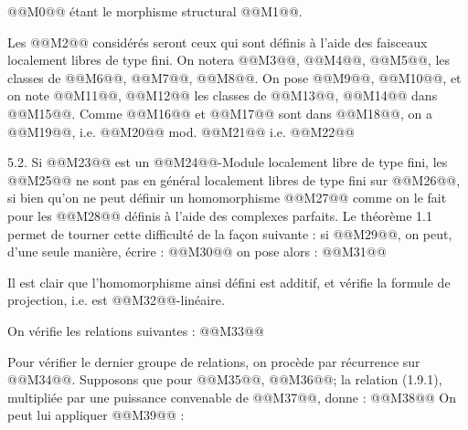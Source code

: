 
@@M0@@
étant le morphisme structural @@M1@@.

Les @@M2@@ considérés seront ceux qui sont définis à l'aide des faisceaux localement libres de type fini. On notera @@M3@@, @@M4@@, @@M5@@, les classes de @@M6@@, @@M7@@, @@M8@@. On pose @@M9@@, @@M10@@, et on note @@M11@@, @@M12@@ les classes de @@M13@@, @@M14@@ dans @@M15@@. Comme @@M16@@ et @@M17@@ sont dans @@M18@@, on a @@M19@@, i.e. @@M20@@ mod. @@M21@@ i.e. @@M22@@

5.2.
Si @@M23@@ est un @@M24@@-Module localement libre de type fini, les @@M25@@ ne sont pas en général localement libres de type fini sur @@M26@@, si bien qu'on ne peut définir un homomorphisme @@M27@@ comme on le fait pour les @@M28@@ définis à l'aide des complexes parfaits. Le théorème 1.1 permet de tourner cette difficulté de la façon suivante : si @@M29@@, on peut, d'une seule manière, écrire :
@@M30@@
on pose alors :
@@M31@@

Il est clair que l'homomorphisme ainsi défini est additif, et vérifie la formule de projection, i.e. est @@M32@@-linéaire.

On vérifie les relations suivantes :
@@M33@@

Pour vérifier le dernier groupe de relations, on procède par récurrence sur @@M34@@. Supposons que pour @@M35@@, @@M36@@; la relation (1.9.1), multipliée par une puissance convenable de @@M37@@, donne :
@@M38@@
On peut lui appliquer @@M39@@ :
